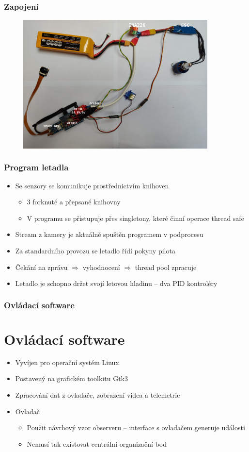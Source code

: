 \documentclass[aspectratio=43]{beamer}
\begin{document}
\begin{frame}[fragile]
	\frametitle{Zapojení}
	\begin{figure}[h]
		\centering
		\includegraphics[height=7cm]{./../img/circuit.jpg}
	\end{figure}
\end{frame}

\begin{frame}[fragile]
	\frametitle{Program letadla}
	\begin{itemize}
		\item Se senzory se komunikuje prostřednictvím knihoven
			\begin{itemize}
				\item 3 forknuté a přepsané knihovny
				\item V programu se přistupuje přes singletony, které činní operace thread safe
			\end{itemize}
		\item Stream z kamery je aktuálně spuštěn programem v podprocesu
		\item Za standardního provozu se letadlo řídí pokyny pilota
		\item Čekání na zprávu $\Rightarrow$ vyhodnocení $\Rightarrow$ thread pool zpracuje
		\item Letadlo je schopno držet svojí letovou hladinu -- dva PID kontroléry
	\end{itemize}
\end{frame}

\begin{frame}[fragile]
	\frametitle{Ovládací software}
	\section{Ovládací software}
	\begin{itemize}
		\item Vyvíjen pro operační systém Linux
		\item Postavený na grafickém toolkitu Gtk3
		\item Zpracování dat z ovladače, zobrazení videa a telemetrie
		\item Ovladač
			\begin{itemize}
				\item Použit návrhový vzor observeru -- interface s ovladačem generuje události
				\item Nemusí tak existovat centrální organizační bod
			\end{itemize}
	\end{itemize}
\end{frame}
\end{document}
